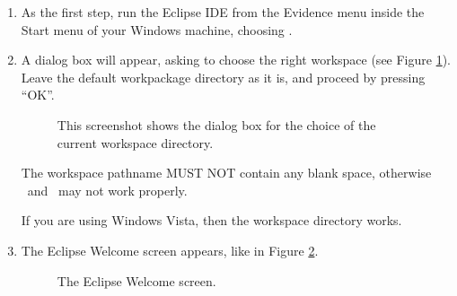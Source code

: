 \begin{enumerate}
\item As the first step, run the Eclipse IDE from the Evidence menu
  inside the Start menu of your Windows machine, choosing 
  .
  
\item A dialog box will appear, asking to choose the right
  workspace (see Figure \ref{fig:select-workspace}). 
  Leave the default workpackage directory
  as it is, and proceed by pressing ``OK''.
%
\begin{figure}[htb]
\caption{This screenshot shows the
dialog box for the choice of the current workspace directory.}
\label{fig:select-workspace}
\end{figure}

\begin{warning}
The workspace pathname MUST NOT contain any blank space, otherwise 
\ee\ and \rtd\ may not work properly.
\end{warning}

\begin{note}
If you are using Windows Vista, then the workspace directory  works.
\end{note}


\item
  The Eclipse Welcome screen appears, like in Figure \ref{fig:welcome}.
%
\begin{figure}[htb]
\caption{The Eclipse Welcome screen.}
\label{fig:welcome}
\end{figure}


\end{enumerate}
